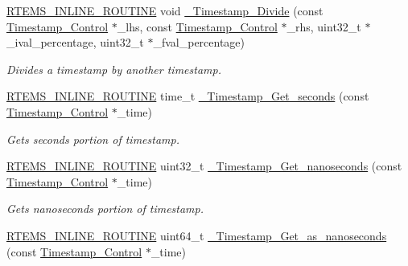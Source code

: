 \begin{DoxyCompactItemize}
\mbox{\hyperlink{group__RTEMSScoreBaseDefs_gac216239df231d5dbd15e3520b0b9313f}{R\+T\+E\+M\+S\+\_\+\+I\+N\+L\+I\+N\+E\+\_\+\+R\+O\+U\+T\+I\+NE}} void \mbox{\hyperlink{group__SuperCoreTimeStamp_ga27337ee8130d19beb9862360089cce3b}{\+\_\+\+Timestamp\+\_\+\+Divide}} (const \mbox{\hyperlink{group__SuperCoreTimeStamp_ga8508036506d5211c98844c88045e2410}{Timestamp\+\_\+\+Control}} $\ast$\+\_\+lhs, const \mbox{\hyperlink{group__SuperCoreTimeStamp_ga8508036506d5211c98844c88045e2410}{Timestamp\+\_\+\+Control}} $\ast$\+\_\+rhs, uint32\+\_\+t $\ast$\+\_\+ival\+\_\+percentage, uint32\+\_\+t $\ast$\+\_\+fval\+\_\+percentage)
\begin{DoxyCompactList}\small\item\em Divides a timestamp by another timestamp. \end{DoxyCompactList}\item 
\mbox{\hyperlink{group__RTEMSScoreBaseDefs_gac216239df231d5dbd15e3520b0b9313f}{R\+T\+E\+M\+S\+\_\+\+I\+N\+L\+I\+N\+E\+\_\+\+R\+O\+U\+T\+I\+NE}} time\+\_\+t \mbox{\hyperlink{group__SuperCoreTimeStamp_gada24d1e501df67120a06af4f5c40e4be}{\+\_\+\+Timestamp\+\_\+\+Get\+\_\+seconds}} (const \mbox{\hyperlink{group__SuperCoreTimeStamp_ga8508036506d5211c98844c88045e2410}{Timestamp\+\_\+\+Control}} $\ast$\+\_\+time)
\begin{DoxyCompactList}\small\item\em Gets seconds portion of timestamp. \end{DoxyCompactList}\item 
\mbox{\hyperlink{group__RTEMSScoreBaseDefs_gac216239df231d5dbd15e3520b0b9313f}{R\+T\+E\+M\+S\+\_\+\+I\+N\+L\+I\+N\+E\+\_\+\+R\+O\+U\+T\+I\+NE}} uint32\+\_\+t \mbox{\hyperlink{group__SuperCoreTimeStamp_ga3675c10bc67f416f801467ba3d73dcb7}{\+\_\+\+Timestamp\+\_\+\+Get\+\_\+nanoseconds}} (const \mbox{\hyperlink{group__SuperCoreTimeStamp_ga8508036506d5211c98844c88045e2410}{Timestamp\+\_\+\+Control}} $\ast$\+\_\+time)
\begin{DoxyCompactList}\small\item\em Gets nanoseconds portion of timestamp. \end{DoxyCompactList}\item 
\mbox{\hyperlink{group__RTEMSScoreBaseDefs_gac216239df231d5dbd15e3520b0b9313f}{R\+T\+E\+M\+S\+\_\+\+I\+N\+L\+I\+N\+E\+\_\+\+R\+O\+U\+T\+I\+NE}} uint64\+\_\+t \mbox{\hyperlink{group__SuperCoreTimeStamp_ga4ad47feda7d728bdc880274b1f3dec1e}{\+\_\+\+Timestamp\+\_\+\+Get\+\_\+as\+\_\+nanoseconds}} (const \mbox{\hyperlink{group__SuperCoreTimeStamp_ga8508036506d5211c98844c88045e2410}{Timestamp\+\_\+\+Control}} $\ast$\+\_\+time)

\end{DoxyCompactItemize}
